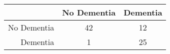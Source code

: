 \begin{table}[ht]
\centering
\begin{tabular}{r|c|c}
  \hline
 & No Dementia & Dementia \\ 
  \hline
No Dementia & 42 & 12 \\ 
  Dementia & 1 & 25 \\ 
   \hline
\end{tabular}
\end{table}
